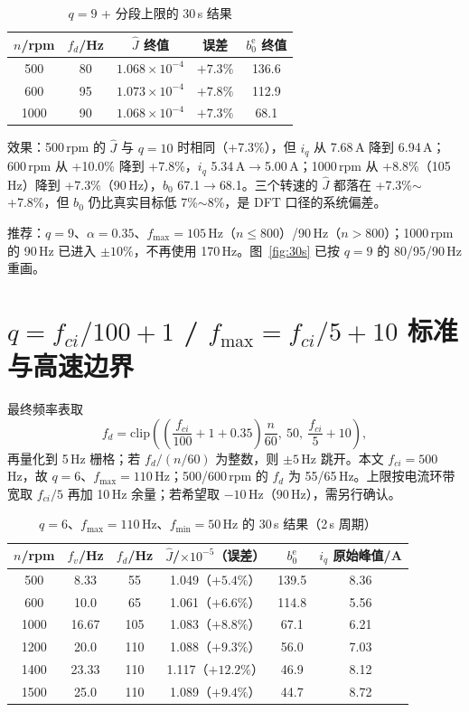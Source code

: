 \documentclass[11pt,a4paper]{article}
\newcommand{\Jhat}{\hat J}
\begin{document}
\begin{table}[H]
\centering\footnotesize
\caption{\(q=9\) + 分段上限的 30\,s 结果}\label{tab:q9}
\begin{tabular}{@{}ccccc@{}}
\toprule
$n$/rpm & $f_d$/Hz & $\Jhat$ 终值 & 误差 & $b_0^{\mathrm e}$ 终值\\
\midrule
500 & 80 & $1.068\times10^{-4}$ & $+7.3\%$ & 136.6\\
600 & 95 & $1.073\times10^{-4}$ & $+7.8\%$ & 112.9\\
1000 & 90 & $1.068\times10^{-4}$ & $+7.3\%$ & 68.1\\
\bottomrule
\end{tabular}
\end{table}

效果：500\,rpm 的 \(\Jhat\) 与 \(q=10\) 时相同（+7.3\%），但 \(i_q\) 从 7.68\,A 降到 6.94\,A；600\,rpm 从 +10.0\% 降到 +7.8\%，\(i_q\) 5.34\,A$\to$5.00\,A；1000\,rpm 从 +8.8\%（105\,Hz）降到 +7.3\%（90\,Hz），\(b_0\) 67.1$\to$68.1。三个转速的 \(\Jhat\) 都落在 +7.3\%$\sim$+7.8\%，但 \(b_0\) 仍比真实目标低 7\%$\sim$8\%，是 DFT 口径的系统偏差。

推荐：\(q=9\)、\(\alpha=0.35\)、\(f_{\max}=105\)\,Hz（\(n\le800\)）/90\,Hz（\(n>800\)）；1000\,rpm 的 90\,Hz 已进入 \(\pm10\%\)，不再使用 170\,Hz。图~\ref{fig:30s} 已按 \(q=9\) 的 80/95/90\,Hz 重画。


\section{\(q=f_{ci}/100+1\) / \(f_{\max}=f_{ci}/5+10\) 标准与高速边界}

最终频率表取
\begin{equation}
f_d=\mathrm{clip}\left(\left(\frac{f_{ci}}{100}+1+0.35\right)\frac{n}{60},\ 50,\ \frac{f_{ci}}{5}+10\right),
\label{eq:fdq6}
\end{equation}
再量化到 5\,Hz 栅格；若 \(f_d/(n/60)\) 为整数，则 \(\pm5\)\,Hz 跳开。本文 \(f_{ci}=500\)\,Hz，故 \(q=6\)、\(f_{\max}=110\)\,Hz；500/600\,rpm 的 \(f_d\) 为 55/65\,Hz。上限按电流环带宽取 \(f_{ci}/5\) 再加 10\,Hz 余量；若希望取 \(-10\)\,Hz（90\,Hz），需另行确认。

\begin{table}[H]
\centering\footnotesize
\caption{\(q=6\)、\(f_{\max}=110\)\,Hz、\(f_{\min}=50\)\,Hz 的 30\,s 结果（2\,s 周期）}\label{tab:q6}
\begin{tabular}{@{}cccccc@{}}
\toprule
$n$/rpm & \(f_v\)/Hz & \(f_d\)/Hz & \(\Jhat\)/$\times10^{-5}$（误差） & \(b_0^{\mathrm e}\) & \(i_q\) 原始峰值/A\\
\midrule
500 & 8.33 & 55 & 1.049（$+5.4\%$） & 139.5 & 8.36\\
600 & 10.0 & 65 & 1.061（$+6.6\%$） & 114.8 & 5.56\\
1000 & 16.67 & 105 & 1.083（$+8.8\%$） & 67.1 & 6.21\\
1200 & 20.0 & 110 & 1.088（$+9.3\%$） & 56.0 & 7.03\\
1400 & 23.33 & 110 & 1.117（$+12.2\%$） & 46.9 & 8.12\\
1500 & 25.0 & 110 & 1.089（$+9.4\%$） & 44.7 & 8.72\\
\bottomrule
\end{tabular}
\end{table}
\end{document}
